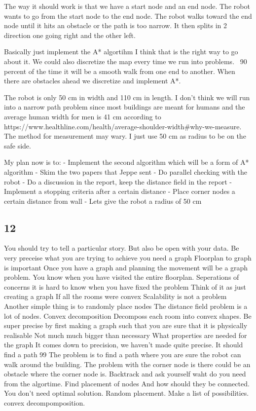 The way it should work is that we have a start node and an end node. The robot wants to go from the start node to the end node. The robot walks toward the end node until it hits an obstacle or the path is too narrow. It then splits in 2 direction one going right and the other left.

Basically just implement the A* algortihm I think that is the right way to go about it.
We could also discretize the map every time we run into problems.  90 percent of the time it will be a smooth walk from one end to another. When there are obstacles ahead we discretize and implement A*. 

The robot is only 50 cm in width and 110 cm in length. I don't think we will run into a narrow path problem since most buildings are meant for humans and the average
human width for men is 41 cm according to  https://www.healthline.com/health/average-shoulder-width#why-we-measure. The method for measurement may wary.
I just use 50 cm as radius to be on the safe side.

My plan now is to:
- Implement the second algorithm which will be a form of A* algorithm
- Skim the two papers that Jeppe sent
- Do parallel checking with the robot
- Do a discussion in the report, keep the distance field in the report
- Implement a stopping criteria after a certain distance
- Place corner nodes a certain distance from wall
- Lets give the robot a radius of 50 cm


\subsection{12}
You should try to tell a particular story. But also be open with your data.
Be very preceise what you are trying to achieve 
you need a graph 
Floorplan to graph is important
Once you have a graph and planning the movement will be a graph problem.
You know when you have visited the entire floorplan.
Seperations of concerns it is hard to know when you have fixed the problem
Think of it as just creating a graph
If all the rooms were convex
Scalability is not a problem
Another simple thing is to randomly place nodes
The distance field problem is a lot of nodes.
Convex decomposition 
Decomposs each room into convex shapes.
Be super precise by first making a graph such that you are sure that it is physically realisable
Not much much bigger than necessary
What properties are needed for the graph
It comes down to precision, we haven't made quite precise.
It should find a path 99%
The problem is to find a path where you are sure the robot can walk around the building.
The problem with the corner node is there could be an obstacle where the corner node is.
Backtrack and ask yourself waht do you need from the algortime.
Find placement of nodes
And how should they be connected.
You don't need optimal solution.
Random placement.
Make a list of possibilities.
convex decompomposition.

